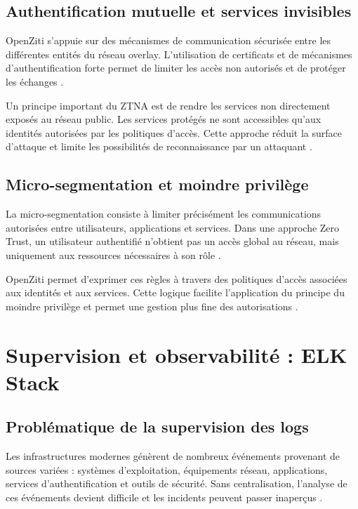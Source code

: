 \documentclass[12pt,a4paper,oneside]{report}
\begin{document}
	\subsection{Authentification mutuelle et services invisibles}
	
	OpenZiti s'appuie sur des mécanismes de communication sécurisée entre les différentes entités du réseau overlay. L'utilisation de certificats et de mécanismes d'authentification forte permet de limiter les accès non autorisés et de protéger les échanges \cite{openziti_docs}.
	
	Un principe important du ZTNA est de rendre les services non directement exposés au réseau public. Les services protégés ne sont accessibles qu'aux identités autorisées par les politiques d'accès. Cette approche réduit la surface d'attaque et limite les possibilités de reconnaissance par un attaquant \cite{openziti_docs,nist_zero_trust}.
	
	\subsection{Micro-segmentation et moindre privilège}
	
	La micro-segmentation consiste à limiter précisément les communications autorisées entre utilisateurs, applications et services. Dans une approche Zero Trust, un utilisateur authentifié n'obtient pas un accès global au réseau, mais uniquement aux ressources nécessaires à son rôle \cite{nist_zero_trust}.
	
	OpenZiti permet d'exprimer ces règles à travers des politiques d'accès associées aux identités et aux services. Cette logique facilite l'application du principe du moindre privilège et permet une gestion plus fine des autorisations \cite{openziti_docs}.
	
	\section{Supervision et observabilité : ELK Stack}
	
	\subsection{Problématique de la supervision des logs}
	
	Les infrastructures modernes génèrent de nombreux événements provenant de sources variées : systèmes d'exploitation, équipements réseau, applications, services d'authentification et outils de sécurité. Sans centralisation, l'analyse de ces événements devient difficile et les incidents peuvent passer inaperçus \cite{elastic_stack_docs}.
	
\end{document}

